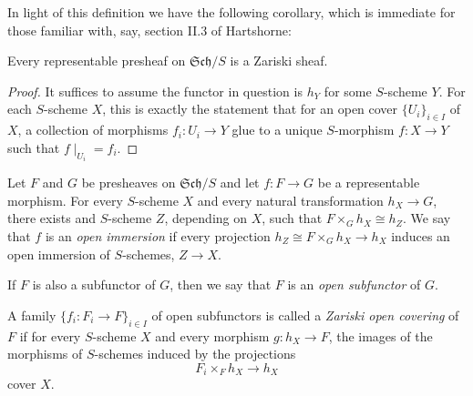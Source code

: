 \documentclass[10pt]{amsart}
\begin{document}
In light of this definition we have the following corollary, which is immediate for those familiar with, say, section II.3 of Hartshorne:

\begin{cor}
  Every representable presheaf on $\mathfrak{Sch}/S$ is a Zariski sheaf.
  \begin{proof}
    It suffices to assume the functor in question is $h_Y$ for some $S$-scheme $Y$.
    For each $S$-scheme $X$, this is exactly the statement that for an open cover $\{U_i\}_{i \in I}$ of $X$, a collection of morphisms $f_i \colon U_i \rightarrow Y$ glue to a unique $S$-morphism $f : X \rightarrow Y$ such that $f\mid_{U_i} = f_i$.
  \end{proof}
\end{cor}

\begin{defn}
  Let $F$ and $G$ be presheaves on $\mathfrak{Sch}/S$ and let $f \colon F \rightarrow G$ be a representable morphism.
  For every $S$-scheme $X$ and every natural transformation $h_X \rightarrow G$, there exists and $S$-scheme $Z$, depending on $X$, such that $F \times_G h_X \cong h_Z$.
  We say that $f$ is an {\em open immersion} if every projection $h_Z \cong F \times_G h_X \rightarrow h_X$ induces an open immersion of $S$-schemes, $Z \rightarrow X$.
  
  If $F$ is also a subfunctor of $G$, then we say that $F$ is an {\em open subfunctor} of $G$.
\end{defn}

\begin{defn}
  A family $\{f_i : F_i \rightarrow F\}_{i \in I}$ of open subfunctors is called a {\em Zariski open covering} of $F$ if for every $S$-scheme $X$ and every morphism $g \colon h_X \rightarrow F$, the images of the morphisms of $S$-schemes induced by the projections
  $$F_i \times_F h_X \rightarrow h_X$$
  cover $X$.
\end{defn}
\end{document}
